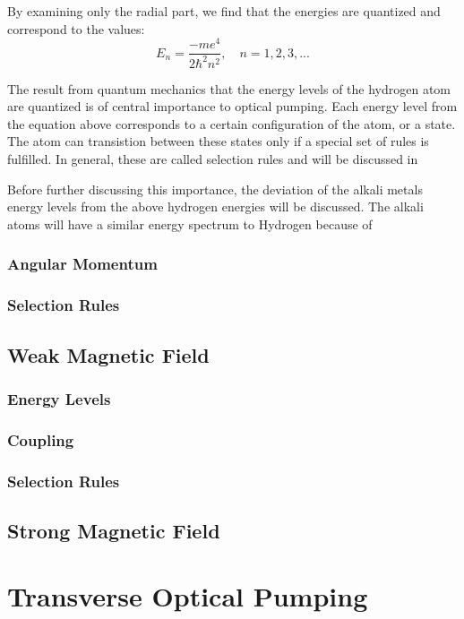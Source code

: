 \documentclass[letter,12pt]{article}
\begin{document}
		By examining only the radial part, we find that the energies
		are quantized and correspond to the values:
		\begin{equation}
			E_n=\frac{-me^4}{2\hbar^2n^2},\quad n=1,2,3,...
		\end{equation}

		The result from quantum mechanics that the energy levels 
		of the hydrogen atom are 
		quantized is of central importance to optical pumping. 
		Each energy level from the equation above 
		corresponds to a certain configuration of the 
		atom, or a state. The atom can transistion between these states
		only if a special set of rules is fulfilled. In general, 
		these are called selection rules and will be discussed in 
		
		Before 
		further discussing this importance, the deviation of the alkali
		metals energy levels from the above hydrogen energies will be
		discussed. 
			The alkali atoms will have a similar energy spectrum to
		Hydrogen because of 

		\subsubsection{Angular Momentum}
        \label{angularMomentum}
		\subsubsection{Selection Rules}\label{selectionRules}

	\subsection{Weak Magnetic Field}
		\subsubsection{Energy Levels}
		\subsubsection{Coupling}
		\subsubsection{Selection Rules}

	\subsection{Strong Magnetic Field}

\section{Transverse Optical Pumping}
\end{document}

